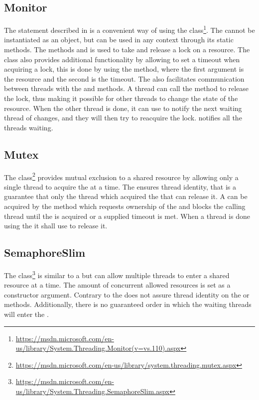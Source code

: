 \subsection{Monitor}
The  statement described in  is a convenient way of using the  class\footnote{\url{https://msdn.microsoft.com/en-us/library/System.Threading.Monitor(v=vs.110).aspx}}. The  cannot be instantiated as an object, but can be used in any context through its static methods. The methods  and  is used to take and release a lock on a resource. The  class also provides additional functionality by allowing to set a timeout when acquiring a lock, this is done by using the  method, where the first argument is the resource and the second is the timeout. The  also facilitates communication between threads with the   and  methods. A thread can call the  method to release the lock, thus making it possible for other threads to change the state of the resource. When the other thread is done, it can use  to notify the next waiting thread of changes, and they will then try to reacquire the lock.  notifies all the threads waiting.
\subsection{Mutex}
The  class\footnote{\url{https://msdn.microsoft.com/en-us/library/system.threading.mutex.aspx}} provides mutual exclusion to a shared resource by allowing only a single thread to acquire the  at a time. The  ensures thread identity, that is a guarantee that only the thread which acquired the  that can release it. A  can be acquired by the method  which requests ownership of the  and blocks the calling thread until the  is acquired or a supplied timeout is met. When a thread is done using the  it shall use  to release it.

\subsection{SemaphoreSlim}
The  class\footnote{\url{https://msdn.microsoft.com/en-us/library/System.Threading.SemaphoreSlim.aspx}} is similar to a  but can allow multiple threads to enter a shared resource at a time. The amount of concurrent allowed resources is set as a constructor argument. Contrary to  the  does not assure thread identity on the  or  methods. Additionally, there is no guaranteed order in which the waiting threads will enter the . 

